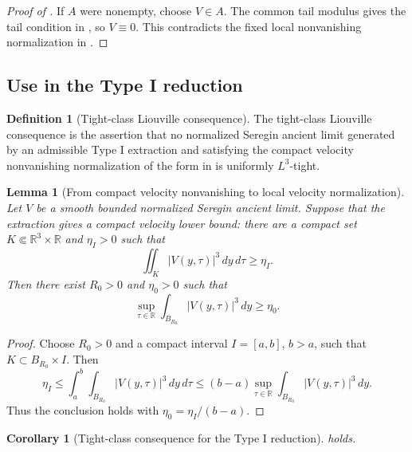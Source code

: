 \documentclass[11pt]{amsart}
\theoremstyle{plain}
\newtheorem{lemma}[lemma]{Lemma}
\newtheorem{corollary}[corollary]{Corollary}
\theoremstyle{definition}
\newtheorem{definition}[definition]{Definition}
\theoremstyle{remark}
\numberwithin{equation}{section}
\newcommand{\R}{\mathbb R}
\begin{document}
\begin{proof}[Proof of ]
If \(A\) were nonempty, choose \(V\in A\).  The common tail modulus gives the
tail condition in , so \(V\equiv0\).  This contradicts
the fixed local nonvanishing normalization in .
\end{proof}

\subsection{Use in the Type I reduction}

\begin{definition}[Tight-class Liouville consequence]
\label{p2:def:tight-class-input}
The tight-class Liouville consequence is the assertion that no normalized
Seregin ancient limit generated by an admissible Type I extraction and
satisfying the compact velocity nonvanishing normalization of the form in
 is uniformly \(L^3\)-tight.
\end{definition}

\begin{lemma}[From compact velocity nonvanishing to local velocity normalization]
\label{p2:lem:seregin-to-velocity-nonzero}
Let \(V\) be a smooth bounded normalized Seregin ancient limit.  Suppose that
the extraction gives a compact velocity lower bound: there are a compact set
\(K\Subset\mathbb R^3\times\mathbb R\) and \(\eta_I>0\) such that
\[
   \iint_K |V(y,\tau)|^3\,dy\,d\tau\ge\eta_I .
\]
Then there exist \(R_0>0\) and \(\eta_0>0\) such that
\[
   \sup_{\tau\in\R}\int_{B_{R_0}}|V(y,\tau)|^3\,dy\ge\eta_0 .
\]
\end{lemma}

\begin{proof}
Choose \(R_0>0\) and a compact interval \(I=[a,b]\), \(b>a\), such that
\(K\subset B_{R_0}\times I\).  Then
\[
   \eta_I
   \le \int_a^b\int_{B_{R_0}}|V(y,\tau)|^3\,dy\,d\tau
   \le (b-a)\sup_{\tau\in\R}
          \int_{B_{R_0}}|V(y,\tau)|^3\,dy .
\]
Thus the conclusion holds with \(\eta_0=\eta_I/(b-a)\).
\end{proof}

\begin{corollary}[Tight-class consequence for the Type I reduction]
\label{p2:cor:tight-input-for-paper-I}
 holds.
\end{corollary}
\end{document}
